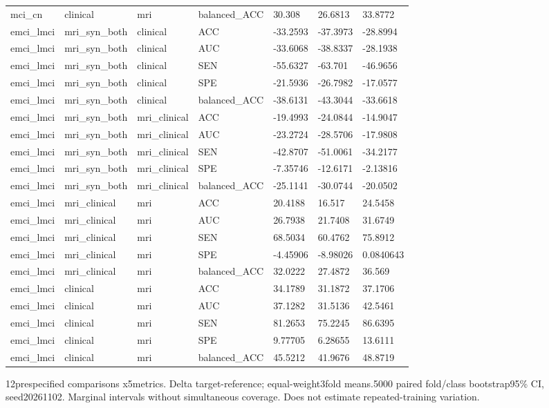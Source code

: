 \begin{landscape}
\begin{longtable}{lllllll}
mci\_cn & clinical & mri & balanced\_ACC & 30.308 & 26.6813 & 33.8772 \\
emci\_lmci & mri\_syn\_both & clinical & ACC & -33.2593 & -37.3973 & -28.8994 \\
emci\_lmci & mri\_syn\_both & clinical & AUC & -33.6068 & -38.8337 & -28.1938 \\
emci\_lmci & mri\_syn\_both & clinical & SEN & -55.6327 & -63.701 & -46.9656 \\
emci\_lmci & mri\_syn\_both & clinical & SPE & -21.5936 & -26.7982 & -17.0577 \\
emci\_lmci & mri\_syn\_both & clinical & balanced\_ACC & -38.6131 & -43.3044 & -33.6618 \\
emci\_lmci & mri\_syn\_both & mri\_clinical & ACC & -19.4993 & -24.0844 & -14.9047 \\
emci\_lmci & mri\_syn\_both & mri\_clinical & AUC & -23.2724 & -28.5706 & -17.9808 \\
emci\_lmci & mri\_syn\_both & mri\_clinical & SEN & -42.8707 & -51.0061 & -34.2177 \\
emci\_lmci & mri\_syn\_both & mri\_clinical & SPE & -7.35746 & -12.6171 & -2.13816 \\
emci\_lmci & mri\_syn\_both & mri\_clinical & balanced\_ACC & -25.1141 & -30.0744 & -20.0502 \\
emci\_lmci & mri\_clinical & mri & ACC & 20.4188 & 16.517 & 24.5458 \\
emci\_lmci & mri\_clinical & mri & AUC & 26.7938 & 21.7408 & 31.6749 \\
emci\_lmci & mri\_clinical & mri & SEN & 68.5034 & 60.4762 & 75.8912 \\
emci\_lmci & mri\_clinical & mri & SPE & -4.45906 & -8.98026 & 0.0840643 \\
emci\_lmci & mri\_clinical & mri & balanced\_ACC & 32.0222 & 27.4872 & 36.569 \\
emci\_lmci & clinical & mri & ACC & 34.1789 & 31.1872 & 37.1706 \\
emci\_lmci & clinical & mri & AUC & 37.1282 & 31.5136 & 42.5461 \\
emci\_lmci & clinical & mri & SEN & 81.2653 & 75.2245 & 86.6395 \\
emci\_lmci & clinical & mri & SPE & 9.77705 & 6.28655 & 13.6111 \\
emci\_lmci & clinical & mri & balanced\_ACC & 45.5212 & 41.9676 & 48.8719 \\
\end{longtable}
\noindent\parbox{\linewidth}{\footnotesize 12prespecified comparisons x5metrics. Delta target-reference; equal-weight3fold means.5000 paired fold/class bootstrap95\% CI, seed20261102. Marginal intervals without simultaneous coverage. Does not estimate repeated-training variation.}
\endgroup
\end{landscape}
